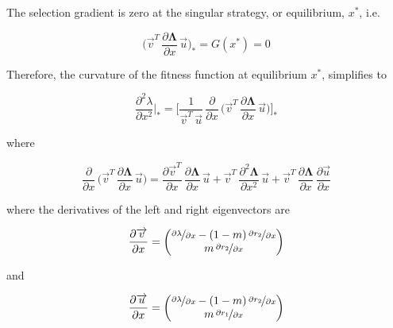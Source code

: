 The selection gradient is zero at the singular strategy, or equilibrium, $x^*$, i.e.

\begin{equation}
    \bigg( \overrightarrow{v}^T\,\frac{
    \partial \pmb \Lambda}{\partial x}\,\overrightarrow{u} \bigg)_* = G(x^*) = 0
\end{equation}

Therefore, the curvature of the fitness function at equilibrium $x^*$, simplifies to

\begin{equation}
    \frac{\partial^2 \lambda}{\partial x^2}\bigg|_* = \Bigg[ \frac{1}{\overrightarrow{v}^T\,\overrightarrow{u}}\,\frac{\partial}{\partial x}\,\bigg(\overrightarrow{v}^T\,\frac{\partial \pmb{\Lambda}}{\partial x}\,\overrightarrow{u}\bigg) \Bigg]_*
    \label{eq:fitness_curvature_equilibrium}
\end{equation}

where

\begin{equation}
    \frac{\partial}{\partial x} \, \bigg(\overrightarrow{v}^T \, \frac{\partial \pmb{\Lambda}}{\partial x} \, \overrightarrow{u}\bigg) = \frac{\partial \overrightarrow{v}^T}{\partial x}\,\frac{\partial \pmb{\Lambda}}{\partial x}\,\overrightarrow{u} + \overrightarrow{v}^T\,\frac{\partial^2 \pmb{\Lambda}}{\partial x^2}\,\overrightarrow{u} + \overrightarrow{v}^T\,\frac{\partial \pmb{\Lambda}}{\partial x}\,\frac{\partial \overrightarrow{u}}{\partial x}
    \label{eq:deriv_num_gradient_unevaluated}
\end{equation}

where the derivatives of the left and right eigenvectors are

\begin{equation}
    \frac{\partial \overrightarrow{v}}{\partial x} = 
    \begin{pmatrix}
        \nicefrac{\partial \lambda}{\partial x} - (1-m)\,\nicefrac{\partial r_2}{\partial x}\\
        m\,\nicefrac{\partial r_2}{\partial x}
    \end{pmatrix}
\end{equation}

and

\begin{equation}
    \frac{\partial \overrightarrow{u}}{\partial x} = 
    \begin{pmatrix}
        \nicefrac{\partial \lambda}{\partial x} - (1-m)\,\nicefrac{\partial r_2}{\partial x}\\
        m\,\nicefrac{\partial r_1}{\partial x}
    \end{pmatrix}
\end{equation}

